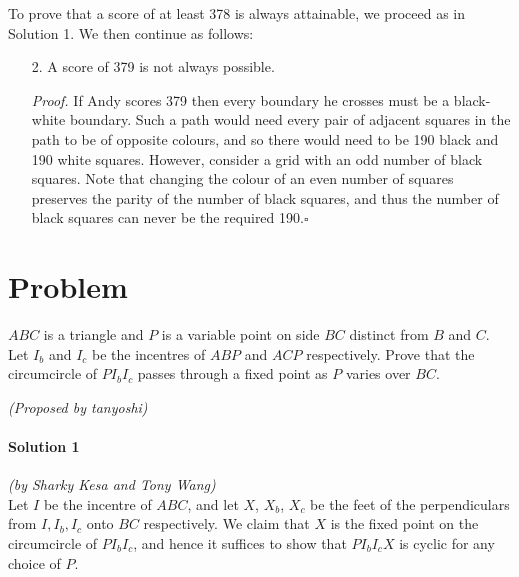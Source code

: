 \documentclass[10pt]{article}
\begin{document}
	\noindent To prove that a score of at least 378 is always attainable, we proceed as in Solution 1. We then continue as follows:
	\begin{enumerate}
	    \item[2.] A score of 379 is not always possible.
	    
	    \emph{Proof.} If Andy scores 379 then every boundary he crosses must be a black-white boundary. Such a path would need every pair of adjacent squares in the path to be of opposite colours, and so there would need to be 190 black and 190 white squares. However, consider a grid with an odd number of black squares. Note that changing the colour of an even number of squares preserves the parity of the number of black squares, and thus the number of black squares can never be the required 190.\hfill \ensuremath{\square}
	\end{enumerate}
	
	\newpage
	
	\section*{Problem {\large \raisebox{1.6pt}{\(\bigcirc\)}}}
	
	\(ABC\) is a triangle and \(P\) is a variable point on side \(BC\) distinct from \(B\) and \(C.\) Let \(I_b\) and \(I_c\) be the incentres of \(ABP\) and \(ACP\) respectively. Prove that the circumcircle of \(PI_bI_c\) passes through a fixed point as \(P\) varies over \(BC.\)
	\begin{flushright}
	\textit{(Proposed by tanyoshi)}
	\end{flushright}
	
		\noindent \makebox[\linewidth]{\rule{\textwidth}{0.4pt}}	
	
	\paragraph{Solution 1} \textit{(by Sharky Kesa and Tony Wang)}\\
	
	\noindent Let $I$ be the incentre of $ABC$, and let $X$, $X_b$, $X_c$ be the feet of the perpendiculars from $I, I_b, I_c$ onto $BC$ respectively. We claim that $X$ is the fixed point on the circumcircle of $PI_bI_c$, and hence it suffices to show that \(PI_bI_cX\) is cyclic for any choice of \(P\).
	
\end{document}
